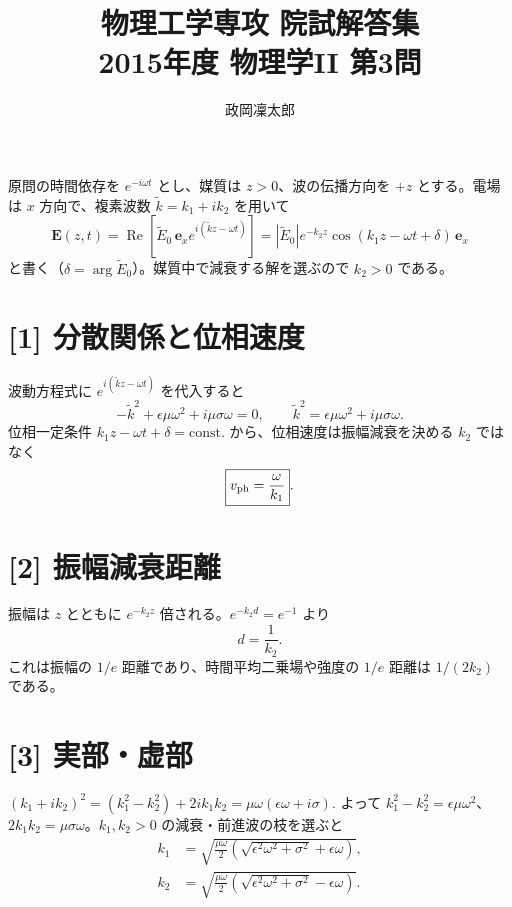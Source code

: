 \documentclass[11pt,a4paper]{article}
\title{物理工学専攻 院試解答集\\2015年度 物理学II 第3問}
\author{政岡凜太郎}
\date{}
\begin{document}
\maketitle

原問の時間依存を $e^{-i\omega t}$ とし、媒質は $z>0$、波の伝播方向を $+z$ とする。電場は $x$ 方向で、複素波数 $\widetilde k=k_1+ik_2$ を用いて
\begin{equation}
 \boldsymbol E(z,t)=\operatorname{Re}\!\left[\widetilde E_0\,\boldsymbol e_x
 e^{i(\widetilde kz-\omega t)}\right]
 =|\widetilde E_0|e^{-k_2z}\cos(k_1z-\omega t+\delta)\,\boldsymbol e_x
\end{equation}
と書く（$\delta=\arg\widetilde E_0$）。媒質中で減衰する解を選ぶので $k_2>0$ である。

\section*{[1] 分散関係と位相速度}
波動方程式に $e^{i(\widetilde kz-\omega t)}$ を代入すると
\begin{equation}
 -\widetilde k^2+\epsilon\mu\omega^2+i\mu\sigma\omega=0,
 \qquad \boxed{\widetilde k^2=\epsilon\mu\omega^2+i\mu\sigma\omega}.
\end{equation}
位相一定条件 $k_1z-\omega t+\delta=\text{const.}$ から、位相速度は振幅減衰を決める $k_2$ ではなく
\begin{equation}
 \boxed{v_{\rm ph}=\frac{\omega}{k_1}}.
\end{equation}

\section*{[2] 振幅減衰距離}
振幅は $z$ とともに $e^{-k_2z}$ 倍される。$e^{-k_2d}=e^{-1}$ より
\begin{equation}
 \boxed{d=\frac{1}{k_2}}.
\end{equation}
これは振幅の $1/e$ 距離であり、時間平均二乗場や強度の $1/e$ 距離は $1/(2k_2)$ である。

\section*{[3] 実部・虚部}
$
(k_1+ik_2)^2=(k_1^2-k_2^2)+2ik_1k_2
=\mu\omega(\epsilon\omega+i\sigma).
$
よって $k_1^2-k_2^2=\epsilon\mu\omega^2$、$2k_1k_2=\mu\sigma\omega$。$k_1,k_2>0$ の減衰・前進波の枝を選ぶと
\begin{align}
 k_1&=\boxed{\sqrt{\frac{\mu\omega}{2}
 \left(\sqrt{\epsilon^2\omega^2+\sigma^2}+\epsilon\omega\right)}},\\
 k_2&=\boxed{\sqrt{\frac{\mu\omega}{2}
 \left(\sqrt{\epsilon^2\omega^2+\sigma^2}-\epsilon\omega\right)}}.
\end{align}
\end{document}
